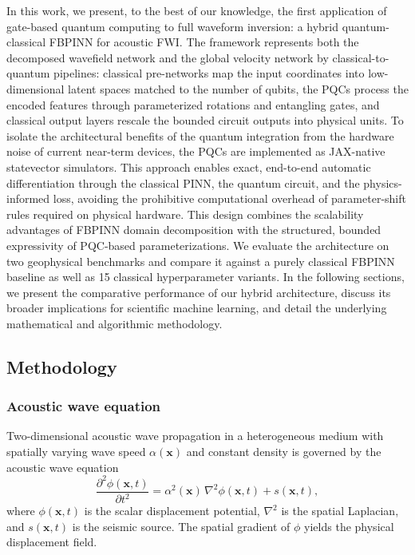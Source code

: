 In this work, we present, to the best of our knowledge, the first application of gate-based quantum computing to full waveform inversion: a hybrid quantum-classical FBPINN for acoustic FWI. The framework represents both the decomposed wavefield network and the global velocity network by classical-to-quantum pipelines: classical pre-networks map the input coordinates into low-dimensional latent spaces matched to the number of qubits, the PQCs process the encoded features through parameterized rotations and entangling gates, and classical output layers rescale the bounded circuit outputs into physical units. To isolate the architectural benefits of the quantum integration from the hardware noise of current near-term devices, the PQCs are implemented as JAX-native statevector simulators. This approach enables exact, end-to-end automatic differentiation through the classical PINN, the quantum circuit, and the physics-informed loss, avoiding the prohibitive computational overhead of parameter-shift rules required on physical hardware. This design combines the scalability advantages of FBPINN domain decomposition with the structured, bounded expressivity of PQC-based parameterizations. We evaluate the architecture on two geophysical benchmarks and compare it against a purely classical FBPINN baseline as well as 15 classical hyperparameter variants. In the following sections, we present the comparative performance of our hybrid architecture, discuss its broader implications for scientific machine learning, and detail the underlying mathematical and algorithmic methodology.

\subsection{Methodology}\label{sec:ch4-method}

\subsubsection{Acoustic wave equation}
\label{sec:ch4-methods-wave}

Two-dimensional acoustic wave propagation in a heterogeneous medium with spatially varying wave speed $\alpha(\mathbf{x})$ and constant density is governed by the acoustic wave equation
\begin{equation}
\frac{\partial^{2} \phi(\mathbf{x},t)}{\partial t^{2}}
= \alpha^{2}(\mathbf{x})\,\nabla^{2} \phi(\mathbf{x},t) + s(\mathbf{x},t),
\label{eq:ch4-acoustic-wave}
\end{equation}
where $\phi(\mathbf{x},t)$ is the scalar displacement potential, $\nabla^2$ is the spatial Laplacian, and $s(\mathbf{x},t)$ is the seismic source. The spatial gradient of $\phi$ yields the physical displacement field.

